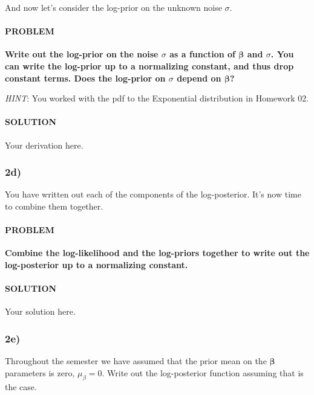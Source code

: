 \documentclass[
]{article}
\begin{document}
And now let's consider the log-prior on the unknown noise \(\sigma\).

\hypertarget{problem-9}{%
\paragraph{PROBLEM}\label{problem-9}}

\textbf{Write out the log-prior on the noise \(\sigma\) as a function of
\(\boldsymbol{\beta}\) and \(\sigma\). You can write the log-prior up to
a normalizing constant, and thus drop constant terms. Does the log-prior
on \(\sigma\) depend on \(\boldsymbol{\beta}\)?}

\emph{HINT}: You worked with the pdf to the Exponential distribution in
Homework 02.

\hypertarget{solution-9}{%
\paragraph{SOLUTION}\label{solution-9}}

Your derivation here.

\hypertarget{d-1}{%
\subsubsection{2d)}\label{d-1}}

You have written out each of the components of the log-posterior. It's
now time to combine them together.

\hypertarget{problem-10}{%
\paragraph{PROBLEM}\label{problem-10}}

\textbf{Combine the log-likelihood and the log-priors together to write
out the log-posterior up to a normalizing constant.}

\hypertarget{solution-10}{%
\paragraph{SOLUTION}\label{solution-10}}

Your solution here.

\hypertarget{e-1}{%
\subsubsection{2e)}\label{e-1}}

Throughout the semester we have assumed that the prior mean on the
\(\boldsymbol{\beta}\) parameters is zero, \(\mu_{\beta}=0\). Write out
the log-posterior function assuming that is the case.
\end{document}

